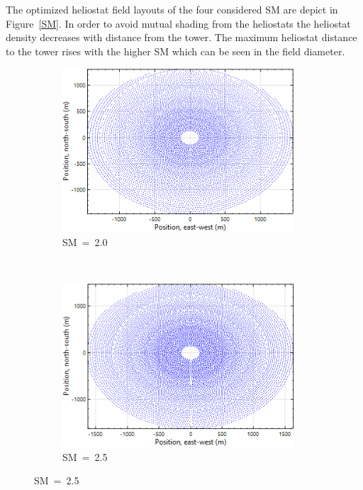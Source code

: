 The optimized heliostat field layouts of the four considered SM are depict in Figure~\ref{SM}. In order to avoid mutual shading from the heliostats the heliostat density decreases with distance from the tower. The maximum heliostat distance to the tower rises with the higher SM which can be seen in the field diameter. 
\begin{figure}[!htbp]
        \centering   
        \begin{subfigure}[b]{0.5\textwidth}
                \centering
                \includegraphics[width=0.95\textwidth]{FIG/SM20}
                \caption{SM~=~2.0}\label{SM2.0}
        \end{subfigure}%
        ~
        \begin{subfigure}[b]{0.5\textwidth}
                \centering
                \includegraphics[width=0.95\textwidth]{FIG/SM25}
                \caption{SM~=~2.5}\label{SM2.5}
        \end{subfigure}
        

\end{figure}
